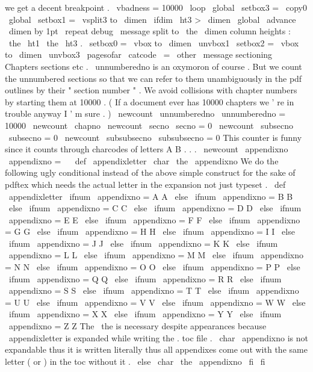 {{we
get
a
decent
breakpoint
.
{
%
\
vbadness
=
10000
\
loop
\
global
\
setbox3
=
\
copy0
\
global
\
setbox1
=
\
vsplit3
to
\
dimen
\
ifdim
\
ht3
>
\
dimen
\
global
\
advance
\
dimen
by
1pt
\
repeat
}
%
%
debug
\
message
{
split
to
\
the
\
dimen
column
heights
:
\
the
\
ht1
\
the
\
ht3
.
}
%
\
setbox0
=
\
vbox
to
\
dimen
{
\
unvbox1
}
%
\
setbox2
=
\
vbox
to
\
dimen
{
\
unvbox3
}
%
%
\
pagesofar
}
\
catcode
\
=
\
other
\
message
{
sectioning
}
%
Chapters
sections
etc
.
%
\
unnumberedno
is
an
oxymoron
of
course
.
But
we
count
the
unnumbered
%
sections
so
that
we
can
refer
to
them
unambiguously
in
the
pdf
%
outlines
by
their
"
section
number
"
.
We
avoid
collisions
with
chapter
%
numbers
by
starting
them
at
10000
.
(
If
a
document
ever
has
10000
%
chapters
we
'
re
in
trouble
anyway
I
'
m
sure
.
)
\
newcount
\
unnumberedno
\
unnumberedno
=
10000
\
newcount
\
chapno
\
newcount
\
secno
\
secno
=
0
\
newcount
\
subsecno
\
subsecno
=
0
\
newcount
\
subsubsecno
\
subsubsecno
=
0
%
This
counter
is
funny
since
it
counts
through
charcodes
of
letters
A
B
.
.
.
\
newcount
\
appendixno
\
appendixno
=
\
%
%
\
def
\
appendixletter
{
\
char
\
the
\
appendixno
}
%
We
do
the
following
ugly
conditional
instead
of
the
above
simple
%
construct
for
the
sake
of
pdftex
which
needs
the
actual
%
letter
in
the
expansion
not
just
typeset
.
%
\
def
\
appendixletter
{
%
\
ifnum
\
appendixno
=
A
A
%
\
else
\
ifnum
\
appendixno
=
B
B
%
\
else
\
ifnum
\
appendixno
=
C
C
%
\
else
\
ifnum
\
appendixno
=
D
D
%
\
else
\
ifnum
\
appendixno
=
E
E
%
\
else
\
ifnum
\
appendixno
=
F
F
%
\
else
\
ifnum
\
appendixno
=
G
G
%
\
else
\
ifnum
\
appendixno
=
H
H
%
\
else
\
ifnum
\
appendixno
=
I
I
%
\
else
\
ifnum
\
appendixno
=
J
J
%
\
else
\
ifnum
\
appendixno
=
K
K
%
\
else
\
ifnum
\
appendixno
=
L
L
%
\
else
\
ifnum
\
appendixno
=
M
M
%
\
else
\
ifnum
\
appendixno
=
N
N
%
\
else
\
ifnum
\
appendixno
=
O
O
%
\
else
\
ifnum
\
appendixno
=
P
P
%
\
else
\
ifnum
\
appendixno
=
Q
Q
%
\
else
\
ifnum
\
appendixno
=
R
R
%
\
else
\
ifnum
\
appendixno
=
S
S
%
\
else
\
ifnum
\
appendixno
=
T
T
%
\
else
\
ifnum
\
appendixno
=
U
U
%
\
else
\
ifnum
\
appendixno
=
V
V
%
\
else
\
ifnum
\
appendixno
=
W
W
%
\
else
\
ifnum
\
appendixno
=
X
X
%
\
else
\
ifnum
\
appendixno
=
Y
Y
%
\
else
\
ifnum
\
appendixno
=
Z
Z
%
%
The
\
the
is
necessary
despite
appearances
because
\
appendixletter
is
%
expanded
while
writing
the
.
toc
file
.
\
char
\
appendixno
is
not
%
expandable
thus
it
is
written
literally
thus
all
appendixes
come
out
%
with
the
same
letter
(
or
)
in
the
toc
without
it
.
\
else
\
char
\
the
\
appendixno
\
fi
\
fi
\
}}
